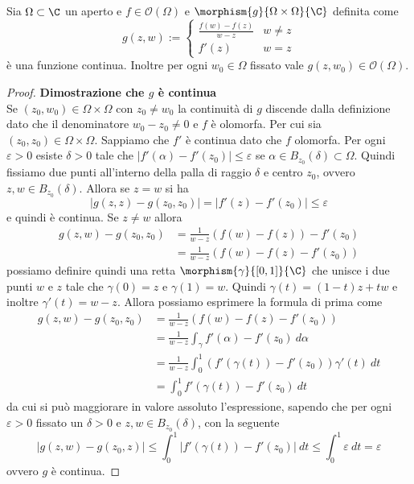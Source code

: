  \begin{lemma}
   Sia $\Omega \subset \C$ un aperto e $f \in \mathcal{O}(\Omega)$
   e $\morphism{g}{\Omega\times\Omega}{\C}$ definita come 
   \begin{equation*}
     g(z,w) :=
     \begin{cases}
       \frac{f(w) - f(z)}{w-z} & w \neq z \\
       f'(z)                   & w = z
     \end{cases}
   \end{equation*}
   è una funzione continua. Inoltre per ogni $w_0 \in \Omega$ fissato vale
   $g(z,w_0) \in \mathcal{O}(\Omega)$.
   \label{lem:rapporto-incrementale-funzione-olomorfa}
 \end{lemma}
 \begin{proof}
    \textbf{Dimostrazione che $g$ è continua} \\
    
    Se $(z_0, w_0) \in \Omega\times\Omega$ con $z_0 \neq w_0$ la
    continuità di $g$ discende dalla definizione dato che il denominatore
    $w_0 - z_0 \neq 0$ e $f$ è olomorfa. 
    Per cui sia $(z_0, z_0) \in \Omega \times \Omega$. Sappiamo che $f'$
    è continua dato che $f$ olomorfa. Per ogni $\varepsilon > 0$ esiste $\delta
    >0$ tale che $|f'(\alpha) - f'(z_0)| \le \varepsilon$ se $\alpha \in
    B_{z_0}(\delta) \subset \Omega$. Quindi fissiamo due punti all'interno
    della palla di raggio $\delta$ e centro $z_0$, ovvero $z,w \in
    B_{z_0}(\delta)$. Allora se $z = w$ si ha 
    \begin{equation*}
      |g(z,z) - g(z_0,z_0)| = |f'(z) - f'(z_0)| \le \varepsilon
    \end{equation*}
    e quindi è continua. Se $z \neq w$ allora
    \begin{align*}
    g(z,w) - g(z_0, z_0) & = \frac{1}{w-z}(f(w) - f(z)) - f'(z_0) \\
    & = \frac{1}{w-z}(f(w)- f(z) - f'(z_0)) 
    \end{align*}
    possiamo definire quindi una retta $\morphism{\gamma}{\left[0,1
    \right]}{\C}$ che unisce i due punti $w$ e $z$ tale che 
    $\gamma(0) = z$ e $\gamma(1) = w$. Quindi $\gamma(t) = (1-t)z+ tw$
    e inoltre $\gamma'(t) = w - z$. Allora possiamo esprimere la formula di
    prima come
    \begin{align*}
       g(z,w) - g(z_0, z_0) & = \frac{1}{w-z}(f(w)- f(z) - f'(z_0)) \\
        & = \frac{1}{w-z} \int_\gamma f'(\alpha) - f'(z_0)\ d\alpha \\
        & = \frac{1}{w-z} \int^1_0 (f'(\gamma(t)) - f'(z_0)) \gamma'(t)\
        dt \\
        & = \int^1_0 f'(\gamma(t)) - f'(z_0)\ dt
    \end{align*}
    da cui si può maggiorare in valore assoluto l'espressione, sapendo
    che per ogni $\varepsilon > 0$ fissato un $\delta >0$ e $z,w \in
    B_{z_0}(\delta)$, con la seguente
    \begin{equation*}
      |g(z,w) - g(z_0,z)| \le \int^1_0 |f'(\gamma(t)) - f'(z_0)|\ dt \le
      \int^1_0 \varepsilon\ dt = \varepsilon
    \end{equation*}
    ovvero $g$ è continua.


\end{proof}
